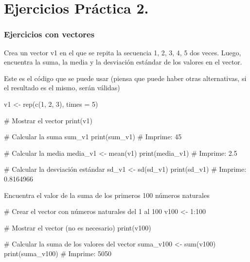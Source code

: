 \documentclass[
  letterpaper,
]{scrbook}
\newenvironment{Shaded}{\begin{snugshade}}{\end{snugshade}}
\newcommand{\AttributeTok}[1]{\textcolor[rgb]{0.40,0.45,0.13}{#1}}
\newcommand{\CommentTok}[1]{\textcolor[rgb]{0.37,0.37,0.37}{#1}}
\newcommand{\DecValTok}[1]{\textcolor[rgb]{0.68,0.00,0.00}{#1}}
\newcommand{\FunctionTok}[1]{\textcolor[rgb]{0.28,0.35,0.67}{#1}}
\newcommand{\NormalTok}[1]{\textcolor[rgb]{0.00,0.23,0.31}{#1}}
\newcommand{\OtherTok}[1]{\textcolor[rgb]{0.00,0.23,0.31}{#1}}
\newcommand{\SpecialCharTok}[1]{\textcolor[rgb]{0.37,0.37,0.37}{#1}}
\begin{document}
\hypertarget{ejercicios-pruxe1ctica-2.}{%
\chapter{Ejercicios Práctica 2.}\label{ejercicios-pruxe1ctica-2.}}

\hypertarget{ejercicios-con-vectores-1}{%
\subsection{Ejercicios con vectores}\label{ejercicios-con-vectores-1}}

Crea un vector v1 en el que se repita la secuencia 1, 2, 3, 4, 5 dos
veces. Luego, encuentra la suma, la media y la desviación estándar de
los valores en el vector.

Este es el código que se puede usar (piensa que puede haber otras
alternativas, si el resultado es el mismo, serán válidas)

\begin{Shaded}
\begin{Highlighting}[]
\NormalTok{v1 }\OtherTok{\textless{}{-}} \FunctionTok{rep}\NormalTok{(}\FunctionTok{c}\NormalTok{(}\DecValTok{1}\NormalTok{, }\DecValTok{2}\NormalTok{, }\DecValTok{3}\NormalTok{), }\AttributeTok{times =} \DecValTok{5}\NormalTok{)}

\CommentTok{\# Mostrar el vector}
\FunctionTok{print}\NormalTok{(v1)}


\CommentTok{\# Calcular la suma}
\NormalTok{sum\_v1}
\FunctionTok{print}\NormalTok{(sum\_v1)}
\CommentTok{\# Imprime: 45}

\CommentTok{\# Calcular la media}
\NormalTok{media\_v1 }\OtherTok{\textless{}{-}} \FunctionTok{mean}\NormalTok{(v1)}
\FunctionTok{print}\NormalTok{(media\_v1)}
\CommentTok{\# Imprime: 2.5}

\CommentTok{\# Calcular la desviación estándar}
\NormalTok{sd\_v1 }\OtherTok{\textless{}{-}} \FunctionTok{sd}\NormalTok{(sd\_v1)}
\FunctionTok{print}\NormalTok{(sd\_v1)}
\CommentTok{\# Imprime: 0.8164966}
\end{Highlighting}
\end{Shaded}

Encuentra el valor de la suma de los primeros 100 números naturales

\begin{Shaded}
\begin{Highlighting}[]
\CommentTok{\# Crear el vector con números naturales del 1 al 100}
\NormalTok{v100 }\OtherTok{\textless{}{-}} \DecValTok{1}\SpecialCharTok{:}\DecValTok{100}

\CommentTok{\# Mostrar el vector (no es necesario)}
\FunctionTok{print}\NormalTok{(v100)}

\CommentTok{\# Calcular la suma de los valores del vector}
\NormalTok{suma\_v100 }\OtherTok{\textless{}{-}} \FunctionTok{sum}\NormalTok{(v100)}
\FunctionTok{print}\NormalTok{(suma\_v100)}
\CommentTok{\# Imprime: 5050}
\end{Highlighting}
\end{Shaded}
\end{document}
